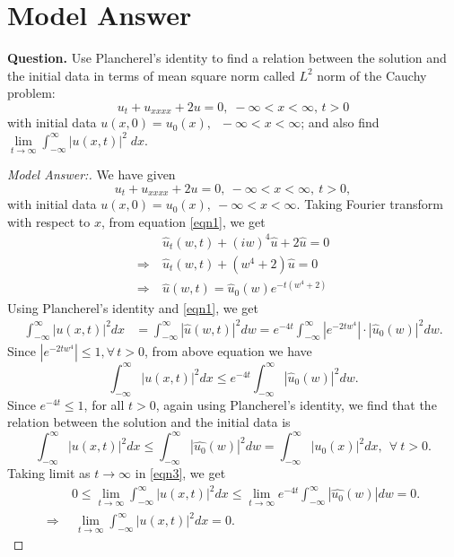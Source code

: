 \documentclass[12pt,leqno]{amsart}
\numberwithin{equation}{section}
\theoremstyle{definition}
\begin{document}
\date{\today}

\baselineskip=16pt
\section{Model Answer}
\noindent
{\bf Question.} 
Use Plancherel's identity to find a relation between the solution and the initial data 
in terms of mean square norm called \(L^2\) norm of the Cauchy problem: 
$$u_t+u_{xxxx} +2u=0,\;-\infty < x < \infty,\, t>0$$ 
with initial data \(u(x,0)=u_0(x),\;\; -\infty < x < \infty\); and also find 
$\lim\limits_{t\to\infty} \int_{-\infty}^{\infty} |u(x,t)|^2\;dx$.

\begin{proof}[Model Answer:]
We have given 
\begin{equation}\label{eqn1}
u_t + u_{xxxx} + 2u = 0,\ -\infty < x < \infty,\ t > 0, 
\end{equation}
with initial data $u(x, 0) = u_0(x),\ -\infty < x < \infty$. 
Taking Fourier transform with respect to $x$, from equation \eqref{eqn1}, we get 
\begin{align}
&\ \widehat{u}_t(w, t) + (iw)^4\widehat{u} + 2\widehat{u} = 0 \nonumber \\
\Longrightarrow &\ \widehat{u}_t(w, t) + (w^4+2)\widehat{u} = 0 \nonumber \\ 
\Longrightarrow &\ \widehat{u}(w, t) = \widehat{u}_0(w) e^{-t(w^4+2)} \label{eqn2}
\end{align}
Using Plancherel's identity and \eqref{eqn1}, we get 
\begin{align*}
\int_{-\infty}^\infty |u(x, t)|^2 dx & = \int_{-\infty}^\infty |\widehat{u}(w, t)|^2 dw 
= e^{-4t} \int_{-\infty}^\infty |e^{-2tw^4}|\cdot |\widehat{u}_0(w)|^2dw. %
\end{align*}
Since $|e^{-2tw^4}| \leq 1, \forall\, t > 0$, from above equation we have 
\begin{equation}\label{eqn3}
	\int_{-\infty}^\infty |u(x, t)|^2 dx \leq e^{-4t} \int_{-\infty}^\infty |\widehat{u}_0(w)|^2 dw. 
\end{equation}
Since $e^{-4t} \leq 1$, for all $t > 0$, again using Plancherel's identity, 
we find that the relation between the solution and the initial data is 
$$\int_{-\infty}^{\infty} |u(x,t)|^2 dx 
\leq \int_{-\infty}^{\infty} |\widehat{u_0}(w)|^2 dw 
= \int_{-\infty}^\infty |u_0(x)|^2 dx,\ \ \forall\ t > 0.$$ 
Taking limit as $t \to \infty$ in \eqref{eqn3}, we get 
\begin{align}
	& \ 0 \leq \lim\limits_{t\to\infty} \int_{-\infty}^{\infty} |u(x, t)|^2 dx 
	\leq \lim\limits_{t\to\infty} e^{-4t}\int_{-\infty}^{\infty} |\widehat{u_0}(w)| dw = 0. \nonumber \\ 
	\Longrightarrow & \ \ \lim\limits_{t\to\infty} \int_{-\infty}^{\infty} |u(x, t)|^2 dx  = 0. \nonumber
\end{align}
\end{proof}


\date{\today}
\end{document}
